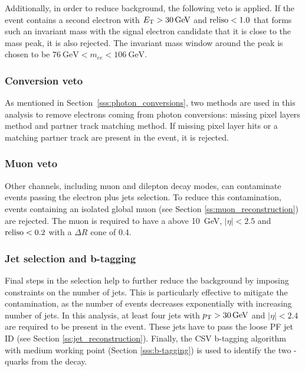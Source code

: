 Additionally, in order to reduce \ZpJets background, the following veto is applied. If the event contains a second
electron with $\ET > \SI{30}{\GeV}$ and $\textrm{reliso} < 1.0$ that forms such an invariant mass with the signal electron
candidate that it is close to the \Z mass peak, it is also rejected. The invariant mass window around the \Z peak is
chosen to be $\SI{76}{\GeV} < m_{ee} < \SI{106}{\GeV}$.


\subsubsection*{Conversion veto}
As mentioned in Section~\ref{sss:photon_conversions}, two methods are used in this analysis to remove electrons coming
from photon conversions: missing pixel layers method and partner track matching method. If missing pixel layer hits or a
matching partner track are present in the event, it is rejected.

\subsubsection*{Muon veto}
Other \ttbar channels, including muon and dilepton decay modes, can contaminate events passing the electron plus jets
selection. To reduce this contamination, events containing an isolated global muon (see Section
\ref{ss:muon_reconstruction}) are rejected. The muon is required to have a \pt above \SI{10}{\GeV}, $|\eta| < 2.5$ and
$\textrm{reliso} < 0.2$ with a $\Delta R$ cone of \num{0.4}.

\subsubsection*{Jet selection and b-tagging}
Final steps in the selection help to further reduce the background by imposing constraints on the number of jets. This
is particularly effective to mitigate the \WpJets contamination, as the number of \WpJets events decreases exponentially
with increasing number of jets. In this analysis, at least four jets with $\pt > \SI{30}{\GeV}$ and $|\eta| < 2.4$ are
required to be present in the event. These jets have to pass the loose PF jet ID (see Section
\ref{ss:jet_reconstruction}). Finally, the CSV b-tagging algorithm with medium working point (Section
\ref{sss:b-tagging}) is used to identify the two \cPqb-quarks from the \ttbar decay.


